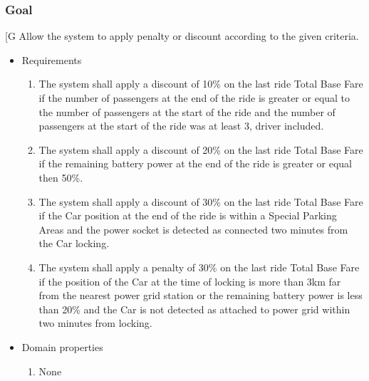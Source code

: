     \subsubsection{Goal }
    {[}G\arabic{goalctr}{]}
    Allow the system to apply penalty or discount according to the given criteria.
    \begin{itemize}
        \item Requirements
        \begin{enumerate}[REQ]
    			\item The system shall apply a discount of 10\% on the last ride Total Base Fare if the number of passengers at the end of the ride is greater or equal to the number of passengers at the start of the ride and the number of passengers at the start of the ride was at least 3, driver included.
    			\item The system shall apply a discount of 20\% on the last ride Total Base Fare if the remaining battery power at the end of the ride is greater or equal then 50\%.
    			\item The system shall apply a discount of 30\% on the last ride Total Base Fare if the Car position at the end of the ride is within a Special Parking Areas and the power socket is detected as connected two minutes from the Car locking.
    			\item The system shall apply a penalty of 30\% on the last ride Total Base Fare if the position of the Car at the time of locking is more than 3km far from the nearest power grid station or the remaining battery power is less than 20\% and the Car is not detected as attached to power grid within two minutes from locking.
        \end{enumerate}
        \item Domain properties
        \begin{enumerate}[PRO]
    	        \item None
    	\end{enumerate}
    \end{itemize} 

